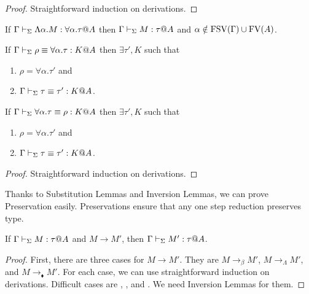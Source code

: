 \begin{proof}
	Straightforward induction on derivations.
\end{proof}

\begin{theorem}
	\begin{item}
	      \item If $\Gamma \vdash_\Sigma \Lambda\alpha.M : \forall\alpha.\tau @A$ then $\Gamma \vdash_\Sigma M : \tau @A$ and $\alpha \notin \text{FSV}(\Gamma) \cup \text{FV}(A)$.
	      \item If $\Gamma \vdash_\Sigma \rho \equiv \forall\alpha.\tau : K @A$ then $\exists \tau', K$ such that
	      \begin{enumerate}
		      \item $\rho = \forall\alpha.\tau'$ and
		      \item $\Gamma \vdash_\Sigma \tau \equiv \tau' : K @A$.
	      \end{enumerate}
	      \item If $\Gamma \vdash_\Sigma \forall\alpha.\tau \equiv \rho : K @A$ then $\exists \tau', K$ such that
	      \begin{enumerate}
		      \item $\rho = \forall\alpha.\tau'$ and
		      \item $\Gamma \vdash_\Sigma \tau \equiv \tau' : K @A$.
	      \end{enumerate}
	\end{item}
\end{theorem}

\begin{proof}
	Straightforward induction on derivations.
\end{proof}


Thanks to Substitution Lemmas and Inversion Lemmas, we can prove Preservation easily.
Preservations ensure that any one step reduction preserves type.

\begin{theorem}[Preservation]
	If $\Gamma\vdash_\Sigma M:\tau @A$ and $M \longrightarrow M'$, then $\Gamma\vdash_\Sigma M':\tau @A$.
\end{theorem}

\begin{proof}
	First, there are three cases for $M \longrightarrow M'$.
	They are $M \longrightarrow_\beta M'$, $M \longrightarrow_\Lambda M'$, and $M \longrightarrow_\blacklozenge M'$.
	For each case, we can use straightforward induction on derivations.
	Difficult cases are \TApp, \TTBL, and \TIns.
	We need Inversion Lemmas for them.
\end{proof}

